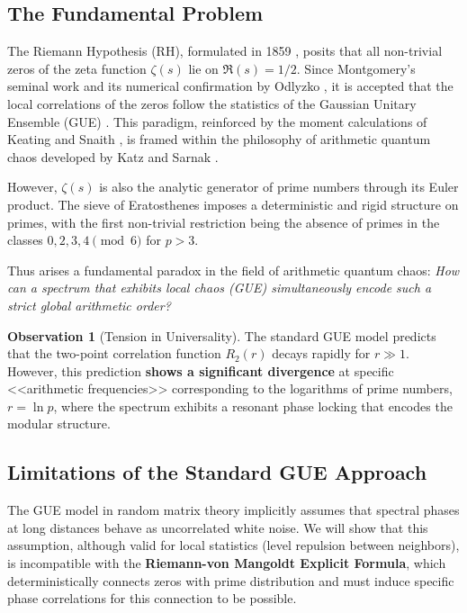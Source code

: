 \documentclass[12pt, a4paper]{article}
\theoremstyle{plain}
\theoremstyle{definition}
\newtheorem{observacion}[teorema]{Observation}
\theoremstyle{remark}
\begin{document}
\subsection{The Fundamental Problem}
\label{subsec:problema_fundamental}

The Riemann Hypothesis (RH), formulated in 1859 \cite{riemann1859}, posits that all non-trivial zeros of the zeta function $\zeta(s)$ lie on $\Re(s)=1/2$. Since Montgomery's seminal work \cite{montgomery1973} and its numerical confirmation by Odlyzko \cite{odlyzko2001}, it is accepted that the local correlations of the zeros follow the statistics of the Gaussian Unitary Ensemble (GUE) \cite{montgomery1973, odlyzko2001, berry1999}. This paradigm, reinforced by the moment calculations of Keating and Snaith \cite{keatingsnaith2000}, is framed within the philosophy of arithmetic quantum chaos developed by Katz and Sarnak \cite{katzsarnak1999, sarnak1999}.

However, $\zeta(s)$ is also the analytic generator of prime numbers through its Euler product. The sieve of Eratosthenes imposes a deterministic and rigid structure on primes, with the first non-trivial restriction being the absence of primes in the classes $0,2,3,4 \pmod{6}$ for $p>3$.

Thus arises a fundamental paradox in the field of arithmetic quantum chaos: \textit{How can a spectrum that exhibits local chaos (GUE) simultaneously encode such a strict global arithmetic order?}

\medskip

\begin{observacion}[Tension in Universality]
The standard GUE model predicts that the two-point correlation function 
$R_2(r)$ decays rapidly for $r \gg 1$. However, this prediction 
\textbf{shows a significant divergence} at specific <<arithmetic frequencies>> corresponding 
to the logarithms of prime numbers, $r = \ln p$, where the spectrum exhibits 
a resonant phase locking that encodes the modular structure.
\end{observacion}

\subsection{Limitations of the Standard GUE Approach}
\label{subsec:limitaciones_gue}

The GUE model in random matrix theory implicitly assumes that spectral phases at long distances behave as uncorrelated white noise. We will show that this assumption, although valid for local statistics (level repulsion between neighbors), is incompatible with the \textbf{Riemann-von Mangoldt Explicit Formula}, which deterministically connects zeros with prime distribution and must induce specific phase correlations for this connection to be possible.
\end{document}
